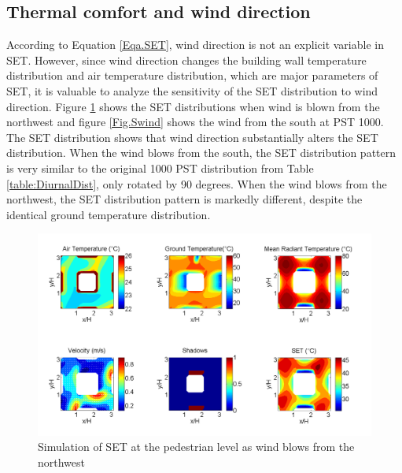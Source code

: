 \documentclass[preprint,3p,12pt,english]{elsarticle}
\begin{document}
\subsection{Thermal comfort and wind direction}

According to Equation \ref{Eqa.SET}, wind direction is not an explicit variable in SET. However, since wind direction changes the building wall temperature distribution \cite{nazarian2014effects} and air temperature distribution, which are major parameters of SET, it is valuable to analyze the sensitivity of the SET distribution to wind direction. Figure \ref{Fig.NWwind} shows the SET distributions when wind is blown from the northwest and figure \ref{Fig.Swind} shows the wind from the south at PST 1000. The SET distribution shows that wind direction substantially alters the SET distribution. When the wind blows from the south, the SET distribution pattern is very similar to the original 1000 PST distribution from Table \ref{table:DiurnalDist}, only rotated by 90 degrees. When the wind blows from the northwest, the SET distribution pattern is markedly different, despite the identical ground temperature distribution. 


\begin{figure}[H]
\graphicspath{ {image/} }
\centerline{\includegraphics[width=14cm]{936_theta45.png}}    
\caption{Simulation of SET at the pedestrian level as wind blows from the northwest}    
\label{Fig.NWwind}
\end{figure}
\end{document}

